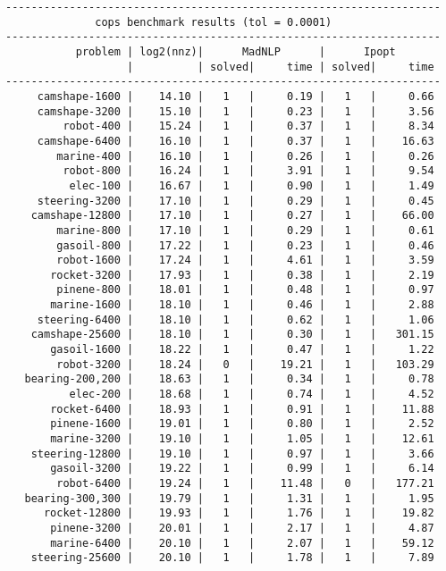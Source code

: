 \begin{verbatim}
--------------------------------------------------------------------
              cops benchmark results (tol = 0.0001)
--------------------------------------------------------------------
           problem | log2(nnz)|      MadNLP      |      Ipopt        
                   |          | solved|     time | solved|     time     
--------------------------------------------------------------------
     camshape-1600 |    14.10 |   1   |     0.19 |   1   |     0.66
     camshape-3200 |    15.10 |   1   |     0.23 |   1   |     3.56
         robot-400 |    15.24 |   1   |     0.37 |   1   |     8.34
     camshape-6400 |    16.10 |   1   |     0.37 |   1   |    16.63
        marine-400 |    16.10 |   1   |     0.26 |   1   |     0.26
         robot-800 |    16.24 |   1   |     3.91 |   1   |     9.54
          elec-100 |    16.67 |   1   |     0.90 |   1   |     1.49
     steering-3200 |    17.10 |   1   |     0.29 |   1   |     0.45
    camshape-12800 |    17.10 |   1   |     0.27 |   1   |    66.00
        marine-800 |    17.10 |   1   |     0.29 |   1   |     0.61
        gasoil-800 |    17.22 |   1   |     0.23 |   1   |     0.46
        robot-1600 |    17.24 |   1   |     4.61 |   1   |     3.59
       rocket-3200 |    17.93 |   1   |     0.38 |   1   |     2.19
        pinene-800 |    18.01 |   1   |     0.48 |   1   |     0.97
       marine-1600 |    18.10 |   1   |     0.46 |   1   |     2.88
     steering-6400 |    18.10 |   1   |     0.62 |   1   |     1.06
    camshape-25600 |    18.10 |   1   |     0.30 |   1   |   301.15
       gasoil-1600 |    18.22 |   1   |     0.47 |   1   |     1.22
        robot-3200 |    18.24 |   0   |    19.21 |   1   |   103.29
   bearing-200,200 |    18.63 |   1   |     0.34 |   1   |     0.78
          elec-200 |    18.68 |   1   |     0.74 |   1   |     4.52
       rocket-6400 |    18.93 |   1   |     0.91 |   1   |    11.88
       pinene-1600 |    19.01 |   1   |     0.80 |   1   |     2.52
       marine-3200 |    19.10 |   1   |     1.05 |   1   |    12.61
    steering-12800 |    19.10 |   1   |     0.97 |   1   |     3.66
       gasoil-3200 |    19.22 |   1   |     0.99 |   1   |     6.14
        robot-6400 |    19.24 |   1   |    11.48 |   0   |   177.21
   bearing-300,300 |    19.79 |   1   |     1.31 |   1   |     1.95
      rocket-12800 |    19.93 |   1   |     1.76 |   1   |    19.82
       pinene-3200 |    20.01 |   1   |     2.17 |   1   |     4.87
       marine-6400 |    20.10 |   1   |     2.07 |   1   |    59.12
    steering-25600 |    20.10 |   1   |     1.78 |   1   |     7.89

\end{verbatim}
